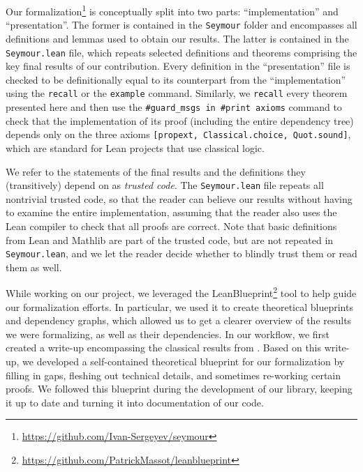 Our formalization\footnote{\url{https://github.com/Ivan-Sergeyev/seymour}} is conceptually split into two parts: ``implementation'' and ``presentation''. The former is contained in the \texttt{Seymour} folder and encompasses all definitions and lemmas used to obtain our results. The latter is contained in the \texttt{Seymour.lean} file, which repeats selected definitions and theorems comprising the key final results of our contribution. Every definition in the ``presentation'' file is checked to be definitionally equal to its counterpart from the ``implementation'' using the \texttt{recall} or the \texttt{example} command. Similarly, we \texttt{recall} every theorem presented here and then use the \texttt{\#guard\_msgs in \#print axioms} command to check that the implementation of its proof (including the entire dependency tree) depends only on the three axioms \texttt{[propext, Classical.choice, Quot.sound]}, which are standard for Lean projects that use classical logic.

We refer to the statements of the final results and the definitions they (transitively) depend on as \emph{trusted code}. The \texttt{Seymour.lean} file repeats all nontrivial trusted code, so that the reader can believe our results \cite{Pollack1997} without having to examine the entire implementation, assuming that the reader also uses the Lean compiler to check that all proofs are correct. Note that basic definitions from Lean and Mathlib are part of the trusted code, but are not repeated in \texttt{Seymour.lean}, and we let the reader decide whether to blindly trust them or read them as well.

While working on our project, we leveraged the LeanBlueprint\footnote{\url{https://github.com/PatrickMassot/leanblueprint}} tool to help guide our formalization efforts. In particular, we used it to create theoretical blueprints and dependency graphs, which allowed us to get a clearer overview of the results we were formalizing, as well as their dependencies. In our workflow, we first created a write-up encompassing the classical results from \cite{Truemper2016}. Based on this write-up, we developed a self-contained theoretical blueprint for our formalization by filling in gaps, fleshing out technical details, and sometimes re-working certain proofs. We followed this blueprint during the development of our library, keeping it up to date and turning it into documentation of our code.

